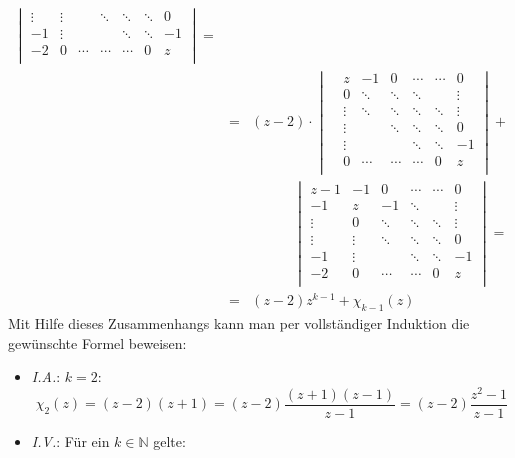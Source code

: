 \begin{flushenum}
\begin{eqnarray*}
\begin{vmatrix}
					\vdots & \vdots &        & \ddots & \ddots & \ddots & 0      \\
					-1     & \vdots &        &        & \ddots & \ddots & -1     \\
					-2     & 0      & \cdots & \cdots & \cdots & 0      & z      \\
				\end{vmatrix} = \\
			&=& (z-2) \cdot
				\begin{vmatrix}
					& z      & -1     & 0      & \cdots & \cdots & 0      \\
                                        & 0      & \ddots & \ddots & \ddots &        & \vdots \\
                                        & \vdots & \ddots & \ddots & \ddots & \ddots & \vdots \\
                                        & \vdots &        & \ddots & \ddots & \ddots & 0      \\
                                        & \vdots &        &        & \ddots & \ddots & -1     \\
                                        & 0      & \cdots & \cdots & \cdots & 0      & z      \\
				\end{vmatrix} + \\
				& & \quad \quad \quad
				\begin{vmatrix}
					z-1    & -1     & 0      & \cdots & \cdots & 0      \\
					-1     & z      & -1     & \ddots &        & \vdots \\
					\vdots & 0      & \ddots & \ddots & \ddots & \vdots \\
					\vdots & \vdots & \ddots & \ddots & \ddots & 0      \\
					-1     & \vdots &        & \ddots & \ddots & -1     \\
					-2     & 0      & \cdots & \cdots & 0      & z      \\
				\end{vmatrix} = \\
			&=& (z-2) z^{k-1} + \chi_{k-1}(z)
	\end{eqnarray*}
	Mit Hilfe dieses Zusammenhangs kann man per vollständiger Induktion die gewünschte Formel beweisen:
	\begin{itemize}
		\item \textit{I.A.}: $k=2$: \[ \chi_2(z) = (z-2)(z+1) = (z-2)\frac{(z+1)(z-1)}{z-1} = (z-2)\frac{z^2 - 1}{z-1} \]
		\item \textit{I.V.}: Für ein $k \in \mathbb{N}$ gelte:

\end{itemize}
\end{flushenum}
